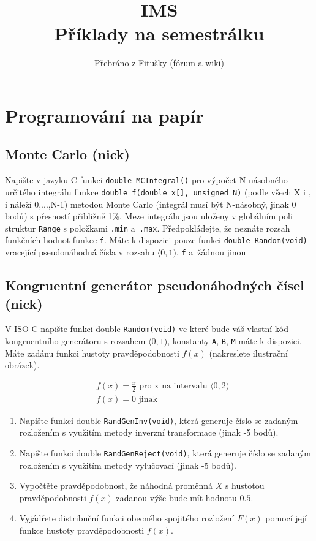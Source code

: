 \documentclass[11pt]{article} %
\title{IMS\\Příklady na semestrálku}
\author{Přebráno z Fitušky (fórum a wiki)}
\begin{document}
\maketitle


\section{Programování na papír}



\subsection{Monte Carlo (nick)}

Napište v jazyku C funkci \texttt{double MCIntegral()} pro výpočet N-násobného určitého integrálu funkce \texttt{double f(double x[], unsigned N)} (podle všech X i , i náleží {0,...,N-1}) metodou Monte Carlo (integrál musí být N-násobný, jinak 0 bodů) s přesností přibližně 1\%. Meze integrálu jsou uloženy v globálním poli struktur \texttt{Range} s položkami \texttt{.min} a~\texttt{.max}. Předpokládejte, že neznáte rozsah funkčních hodnot funkce \texttt{f}. Máte k dispozici pouze funkci \texttt{double Random(void)} vracející pseudonáhodná čísla v rozsahu  $\langle 0,1)$, \texttt{f} a~žádnou jinou




\newpage
\subsection{Kongruentní generátor pseudonáhodných čísel (nick)}
V ISO C napište funkci double \texttt{Random(void)} ve které bude váš vlastní kód kongruentního generátoru s rozsahem $\langle 0,1)$, konstanty \texttt{A}, \texttt{B}, \texttt{M} máte k dispozici. Máte zadánu funkci hustoty pravděpodobnosti $f(x)$ (nakreslete ilustrační obrázek).

\begin{align}
&f(x) = \frac{x}{2} \text{ pro x na intervalu $\langle0,2$)} \\
&f(x) = 0 \text{ jinak}
\end{align}

\begin{enumerate}
\item Napište funkci double \texttt{RandGenInv(void)}, která generuje číslo se zadaným rozložením s využitím metody inverzní transformace (jinak -5 bodů).
\item Napište funkci double \texttt{RandGenReject(void)}, která generuje číslo se zadaným rozložením s využitím metody vylučovací (jinak -5 bodů).
\item Vypočtěte pravděpodobnost, že náhodná proměnná $X$ s hustotou pravděpodobnosti $f(x)$ zadanou výše bude mít hodnotu $0.5$.
\item Vyjádřete distribuční funkci obecného spojitého rozložení $F(x)$ pomocí její funkce hustoty pravděpodobnosti $f(x)$.
\end{enumerate}
\end{document}
